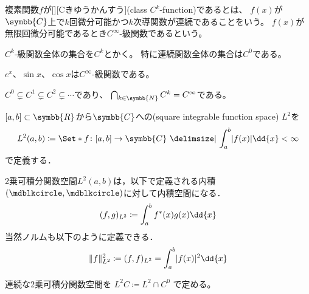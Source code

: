 \documentclass{sotsu}
\newif\ifdraft
\begin{document}
\begin{definition}
    \label{dfn:class-C^k-function}
    複素関数$f$が[][Cきゆうかんすう](class $C^k$-function)であるとは、
    $f(x)$が$\symbb{C}$上で$k$回微分可能かつ$k$次導関数が連続であることをいう。
    $f(x)$が無限回微分可能であるとき$C^\infty$-級関数であるという。

    $C^k$-級関数全体の集合を$C^k$とかく。
    特に連続関数全体の集合は$C^0$である。
\end{definition}

\begin{example}
    $e^x$、$\sin x$、$\cos x$は$C^\infty$-級関数である。
\end{example}

\begin{example}
    $C^0 \subsetneq C^1 \subsetneq C^2 \subsetneq \dotsb$であり、
    $\bigcap_{k \in \symbb{N}} C^k = C^\infty$である。
\end{example}


\begin{definition}
    \label{dfn:square-integrable-function-space}
    $[a, b] \subset \symbb{R}$から$\symbb{C}$への(square integrable function space) $L^2$を
    \begin{equation*}
        L^2 (a, b) \coloneq \Set*{ f \colon [a, b] \to \symbb{C}  \given  \int_a^b \abs{f(x)} \dd{x} < \infty }
    \end{equation*}
    で定義する．
\end{definition}

\begin{proposition}
    2乗可積分関数空間$L^2 (a, b)$は，以下で定義される内積$(\bigdot, \bigdot)$に対して内積空間になる．
    \begin{align}
        (f, g)_{L^2} \coloneq \int_a^b \conj{f}(x) g(x) \dd{x}
    \end{align}
    当然ノルムも以下のように定義できる．
    \begin{align}
        \norm{f}_{L^2}^2 \coloneq (f, f)_{L^2} = \int_a^b \abs{f(x)}^2 \dd{x}
    \end{align}
\end{proposition}

\begin{definition}
    連続な2乗可積分関数空間を
    \( L^2 C \coloneq L^2 \cap C^0 \)
    で定める。
\end{definition}
















\printbibheading

\printbibliography[
    keyword=set,
    heading=subbibliography,
    title={集合論}
]
\printbibliography[
    keyword=lin, 
    heading=subbibliography, 
    title={線形代数}
]




\ifdraft
\else
    \printindex
\fi
\end{document}
